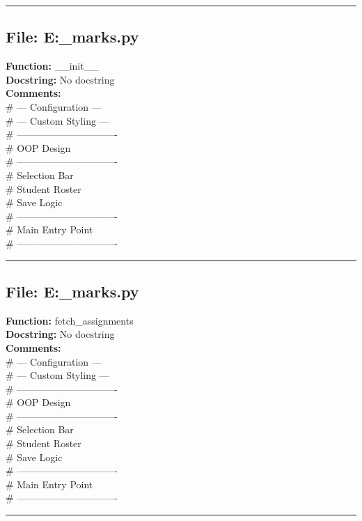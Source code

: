 {\hrule

\subsection*{File: E:\project\capstone\frontend\faculty\assignment_marks.py}
\textbf{Function:} __init__\\
\textbf{Docstring:} No docstring\\
\textbf{Comments:}\\
# --- Configuration ---\\
# --- Custom Styling ---\\
# -------------------------------\\
# OOP Design\\
# -------------------------------\\
# Selection Bar\\
# Student Roster\\
# Save Logic\\
# -------------------------------\\
# Main Entry Point\\
# -------------------------------\\

\hrule

\subsection*{File: E:\project\capstone\frontend\faculty\assignment_marks.py}
\textbf{Function:} fetch_assignments\\
\textbf{Docstring:} No docstring\\
\textbf{Comments:}\\
# --- Configuration ---\\
# --- Custom Styling ---\\
# -------------------------------\\
# OOP Design\\
# -------------------------------\\
# Selection Bar\\
# Student Roster\\
# Save Logic\\
# -------------------------------\\
# Main Entry Point\\
# -------------------------------\\

\hrule

}
